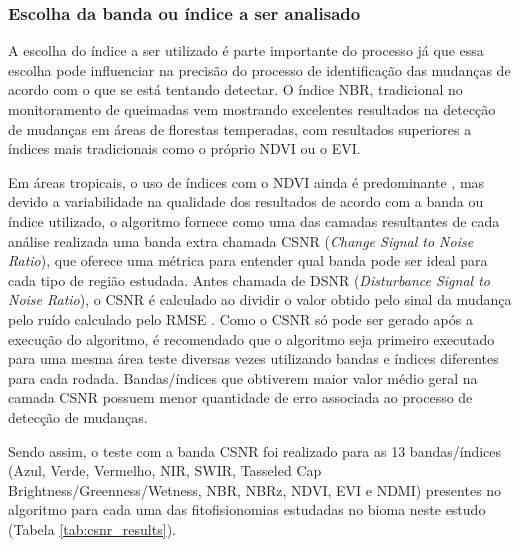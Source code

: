\subsubsection{Escolha da banda ou índice a ser analisado}

A escolha do índice a ser utilizado é parte importante do processo já que essa escolha pode influenciar na precisão do processo de identificação das mudanças de acordo com o que se está tentando detectar. O índice NBR, tradicional no monitoramento de queimadas vem mostrando excelentes resultados na detecção de mudanças em áreas de florestas temperadas, com resultados superiores a índices mais tradicionais como o próprio NDVI ou o EVI.

Em áreas tropicais, o uso de índices com o NDVI ainda é predominante \citep{zebende2019, FRAGAL2016}, mas devido a variabilidade na qualidade dos resultados de acordo com a banda ou índice utilizado, o algoritmo fornece como uma das camadas resultantes de cada análise realizada uma banda extra chamada CSNR (\textit{Change Signal to Noise Ratio}), que oferece uma métrica para entender qual banda pode ser ideal para cada tipo de região estudada. Antes chamada de DSNR (\textit{Disturbance Signal to Noise Ratio}), o CSNR é calculado ao dividir o valor obtido pelo sinal da mudança pelo ruído calculado pelo RMSE \citep{COHEN2018131}. Como o CSNR só pode ser gerado após a execução do algoritmo, é recomendado que o algoritmo seja primeiro executado para uma mesma área teste diversas vezes utilizando bandas e índices diferentes para cada rodada. Bandas/índices que obtiverem maior valor médio geral na camada CSNR possuem menor quantidade de erro associada ao processo de detecção de mudanças.

Sendo assim, o teste com a banda CSNR foi realizado para as 13 bandas/índices (Azul, Verde, Vermelho, NIR, SWIR, Tasseled Cap Brightness/Greenness/Wetness, NBR, NBRz, NDVI, EVI e NDMI) presentes no algoritmo para cada uma das fitofisionomias estudadas no bioma neste estudo (Tabela \ref{tab:csnr_results}). 



